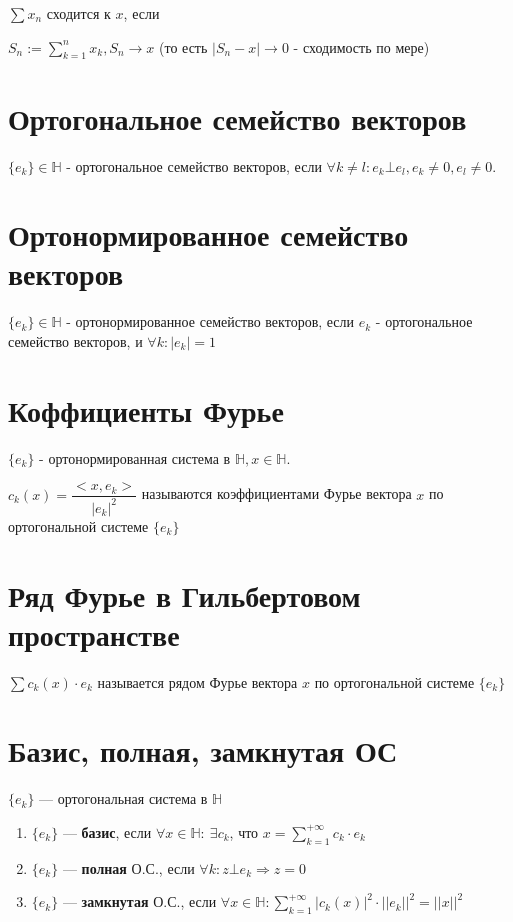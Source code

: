 \documentclass[paper=a4, fontsize=17pt]{article}
\begin{document}
	$\sum x_n$ сходится к $x$, если
	
	$S_n := \sum\limits_{k = 1}^n x_k, S_n \rightarrow x$ (то есть $|S_n - x| \rightarrow 0$ - сходимость по мере) 
	
	\section{Ортогональное семейство векторов}
	$\{e_k\} \in \mathds{H}$ - ортогональное семейство векторов, если $\forall k \neq l: e_k \bot e_l, e_k \neq 0, e_l \neq 0$.
	
	\section{Ортонормированное семейство векторов}
	$\{e_k\} \in \mathds{H}$ - ортонормированное семейство векторов, если ${e_k}$ - ортогональное семейство векторов, и $\forall k: |e_k| = 1 $
	
	\section{Коффициенты Фурье}
	$\{e_k\}$ - ортонормированная система в $\mathds{H}, x \in \mathds{H}$.
	
	$c_k(x) = \dfrac{<x, e_k>}{|e_k|^2}$ называются коэффициентами Фурье вектора $x$ по ортогональной системе $\{e_k\}$
	
	\section{Ряд Фурье в Гильбертовом пространстве}
	
	$\sum c_k(x) \cdot e_k$ называется рядом Фурье вектора $x$ по ортогональной системе $\{e_k\}$
	
	\section{Базис, полная, замкнутая ОС}
	
	$\{e_k\}$ {{---}} ортогональная система в $\mathds{H}$
	
	\begin{enumerate}
		
		\item $\{e_k\}$ {{---}} \textbf{базис}, если $\forall x \in \mathds{H}:\ \exists c_k$, что $x = \sum\limits_{k=1}^{+\infty} c_k \cdot e_k$
		
		\item $\{e_k\}$ {{---}} \textbf{полная} О.С., если $\forall k: z \bot e_k \Rightarrow z = 0$
		
		\item $\{e_k\}$ {{---}} \textbf{замкнутая} О.С., если $\forall x \in \mathds{H}: \sum\limits_{k=1}^{+\infty} |c_k(x)|^2 \cdot ||e_k||^2 = ||x||^2$
		
	\end{enumerate}
	
\end{document}
